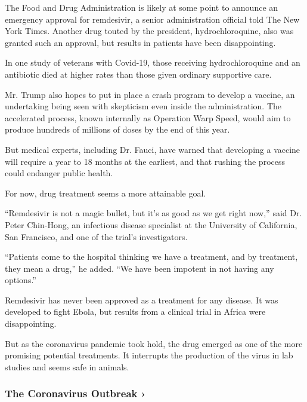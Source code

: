 The Food and Drug Administration is likely at some point to announce an
emergency approval for remdesivir, a senior administration official told
The New York Times. Another drug touted by the president,
hydrochloroquine, also was granted such an approval, but results in
patients have been disappointing.

In one study of veterans with Covid-19, those receiving hydrochloroquine
and an antibiotic died at higher rates than those given ordinary
supportive care.

Mr. Trump also hopes to put in place a crash program to develop a
vaccine, an undertaking being seen with skepticism even inside the
administration. The accelerated process, known internally as Operation
Warp Speed, would aim to produce hundreds of millions of doses by the
end of this year.

But medical experts, including Dr. Fauci, have warned that developing a
vaccine will require a year to 18 months at the earliest, and that
rushing the process could endanger public health.

For now, drug treatment seems a more attainable goal.

``Remdesivir is not a magic bullet, but it's as good as we get right
now,'' said Dr. Peter Chin-Hong, an infectious disease specialist at the
University of California, San Francisco, and one of the trial's
investigators.

``Patients come to the hospital thinking we have a treatment, and by
treatment, they mean a drug,'' he added. ``We have been impotent in not
having any options.''

Remdesivir has never been approved as a treatment for any disease. It
was developed to fight Ebola, but results from a clinical trial in
Africa were disappointing.

But as the coronavirus pandemic took hold, the drug emerged as one of
the more promising potential treatments. It interrupts the production of
the virus in lab studies and seems safe in animals.

\href{https://www.nytimes3xbfgragh.onion/news-event/coronavirus?action=click\&pgtype=Article\&state=default\&region=MAIN_CONTENT_3\&context=storylines_faq}{}

\hypertarget{the-coronavirus-outbreak-}{%
\subsubsection{The Coronavirus Outbreak
›}\label{the-coronavirus-outbreak-}}

